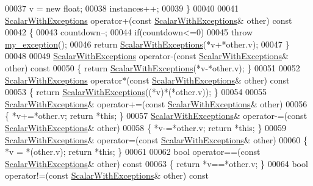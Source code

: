 \begin{DoxyCode}
00037       v = \textcolor{keyword}{new} float;
00038       instances++;
00039     \}
00040 
00041     \hyperlink{class_scalar_with_exceptions}{ScalarWithExceptions} operator+(\textcolor{keyword}{const} 
      \hyperlink{class_scalar_with_exceptions}{ScalarWithExceptions}& other)\textcolor{keyword}{ const}
00042 \textcolor{keyword}{    }\{
00043       countdown--;
00044       \textcolor{keywordflow}{if}(countdown<=0)
00045         \textcolor{keywordflow}{throw} \hyperlink{structmy__exception}{my\_exception}();
00046       \textcolor{keywordflow}{return} \hyperlink{class_scalar_with_exceptions}{ScalarWithExceptions}(*v+*other.v);
00047     \}
00048     
00049     \hyperlink{class_scalar_with_exceptions}{ScalarWithExceptions} operator-(\textcolor{keyword}{const} 
      \hyperlink{class_scalar_with_exceptions}{ScalarWithExceptions}& other)\textcolor{keyword}{ const}
00050 \textcolor{keyword}{    }\{ \textcolor{keywordflow}{return} \hyperlink{class_scalar_with_exceptions}{ScalarWithExceptions}(*v-*other.v); \}
00051     
00052     \hyperlink{class_scalar_with_exceptions}{ScalarWithExceptions} operator*(\textcolor{keyword}{const} 
      \hyperlink{class_scalar_with_exceptions}{ScalarWithExceptions}& other)\textcolor{keyword}{ const}
00053 \textcolor{keyword}{    }\{ \textcolor{keywordflow}{return} \hyperlink{class_scalar_with_exceptions}{ScalarWithExceptions}((*v)*(*other.v)); \}
00054     
00055     \hyperlink{class_scalar_with_exceptions}{ScalarWithExceptions}& operator+=(\textcolor{keyword}{const} 
      \hyperlink{class_scalar_with_exceptions}{ScalarWithExceptions}& other)
00056     \{ *v+=*other.v; \textcolor{keywordflow}{return} *\textcolor{keyword}{this}; \}
00057     \hyperlink{class_scalar_with_exceptions}{ScalarWithExceptions}& operator-=(\textcolor{keyword}{const} 
      \hyperlink{class_scalar_with_exceptions}{ScalarWithExceptions}& other)
00058     \{ *v-=*other.v; \textcolor{keywordflow}{return} *\textcolor{keyword}{this}; \}
00059     \hyperlink{class_scalar_with_exceptions}{ScalarWithExceptions}& operator=(\textcolor{keyword}{const} 
      \hyperlink{class_scalar_with_exceptions}{ScalarWithExceptions}& other)
00060     \{ *v = *(other.v); \textcolor{keywordflow}{return} *\textcolor{keyword}{this}; \}
00061   
00062     \textcolor{keywordtype}{bool} operator==(\textcolor{keyword}{const} \hyperlink{class_scalar_with_exceptions}{ScalarWithExceptions}& other)\textcolor{keyword}{ const}
00063 \textcolor{keyword}{    }\{ \textcolor{keywordflow}{return} *v==*other.v; \}
00064     \textcolor{keywordtype}{bool} operator!=(\textcolor{keyword}{const} \hyperlink{class_scalar_with_exceptions}{ScalarWithExceptions}& other)\textcolor{keyword}{ const}

\end{DoxyCode}
